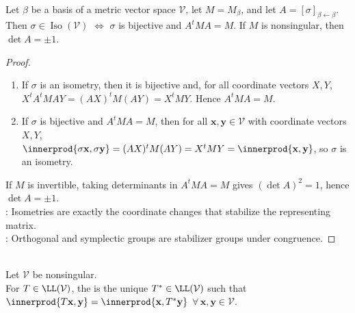 \begin{proposition} \label{prop:matrix-criterion-for-metric-isometries} \\
Let $\beta$ be a basis of a metric vector space $\mathcal{V}$, let $M=M_{\beta}$, and let $A=[\sigma]_{\beta\leftarrow\beta}$.\\
Then $\sigma\in\operatorname{Iso}(\mathcal{V})$ $\iff$ $\sigma$ is bijective and $A^tMA=M$. If $M$ is nonsingular, then $\det A=\pm1$.
\begin{proof}
\begin{enumerate}[label=\roman*.]
\setlength{\itemsep}{0pt}
\item[$(\Rightarrow)$] If $\sigma$ is an isometry, then it is bijective and, for all coordinate vectors $X,Y$,\\
$X^tA^tMAY=(AX)^tM(AY)=X^tMY$. Hence $A^tMA=M$.
\item[$(\Leftarrow)$] If $\sigma$ is bijective and $A^tMA=M$, then for all $\mathbf{x},\mathbf{y}\in\mathcal{V}$ with coordinate vectors $X,Y$,\\
$\innerprod{\sigma\mathbf{x},\sigma\mathbf{y}} =(AX)^tM(AY) =X^tMY =\innerprod{\mathbf{x},\mathbf{y}}$, so $\sigma$ is an isometry.
\end{enumerate}
If $M$ is invertible, taking determinants in $A^tMA=M$ gives $(\det A)^2=1$, hence $\det A=\pm1$.\\
: Isometries are exactly the coordinate changes that stabilize the representing matrix.\\
: Orthogonal and symplectic groups are stabilizer groups under congruence.
\end{proof}
\end{proposition}

\begin{definition} \label{def:metric-adjoint-nonsingular-form} \\
Let $\mathcal{V}$ be nonsingular.\\
For $T\in\LL(\mathcal{V})$, the  is the unique $T^*\in\LL(\mathcal{V})$ such that $\innerprod{T\mathbf{x},\mathbf{y}}=\innerprod{\mathbf{x},T^*\mathbf{y}}$ $\forall\,\mathbf{x},\mathbf{y}\in\mathcal{V}$.
\end{definition}

